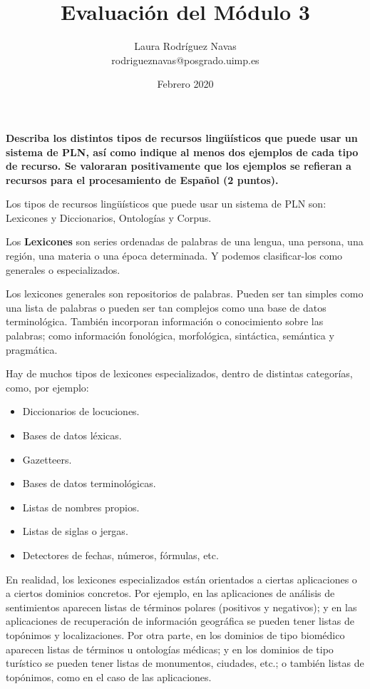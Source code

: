 \documentclass[11pt]{exam}
\title{Evaluación del Módulo 3}
\author{Laura Rodríguez Navas \\ rodrigueznavas@posgrado.uimp.es}
\date{Febrero 2020}
\begin{document}
\maketitle

\begin{questions}
	
{\bf \question Describa los distintos tipos de recursos lingüísticos que puede usar un sistema de PLN, así como indique al menos dos ejemplos de cada tipo de recurso. Se valoraran positivamente que los ejemplos se refieran a recursos para el procesamiento de Español (2 puntos).}

Los tipos de recursos lingüísticos que puede usar un sistema de PLN son: Lexicones y Diccionarios, Ontologías y Corpus.

Los {\bf Lexicones} son series ordenadas de palabras de una lengua, una persona, una región, una materia o una época determinada. Y podemos clasificar-los como generales o especializados.

Los lexicones generales son repositorios de palabras. Pueden ser tan simples como una lista de palabras o pueden ser tan complejos como una base de datos terminológica. También incorporan información o conocimiento sobre las palabras; como información fonológica, morfológica, sintáctica, semántica y pragmática.

Hay de muchos tipos de lexicones especializados, dentro de distintas categorías, como, por ejemplo:

\begin{itemize}
	\item Diccionarios de locuciones.
	\item Bases de datos léxicas.
	\item Gazetteers.
	\item Bases de datos terminológicas.
	\item Listas de nombres propios.
	\item Listas de siglas o jergas.
	\item Detectores de fechas, números, fórmulas, etc.
\end{itemize}

En realidad, los lexicones especializados están orientados a ciertas aplicaciones o a ciertos dominios concretos. Por ejemplo, en las aplicaciones de análisis de sentimientos aparecen listas de términos polares (positivos y negativos); y en las aplicaciones de recuperación de información geográfica se pueden tener listas de topónimos y localizaciones. Por otra parte, en los dominios de tipo biomédico aparecen listas de términos u ontologías médicas; y en los dominios de tipo turístico se pueden tener listas de monumentos, ciudades, etc.; o también listas de topónimos, como en el caso de las aplicaciones.


\end{questions}
\end{document}
